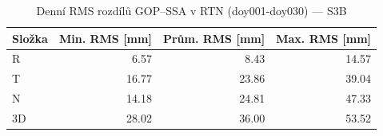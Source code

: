 \begin{table}[H]
\centering
\caption{Denní RMS rozdílů GOP–SSA v RTN (doy001-doy030) — S3B}
\label{tab:bs_ZAZG_doy001-doy030_rms}
\begin{tabular}{lrrr}
\toprule
Složka & Min. RMS [mm] & Prům. RMS [mm] & Max. RMS [mm] \\
\midrule
R & 6.57 & 8.43 & 14.57 \\
T & 16.77 & 23.86 & 39.04 \\
N & 14.18 & 24.81 & 47.33 \\
3D & 28.02 & 36.00 & 53.52 \\
\bottomrule
\end{tabular}
\end{table}
